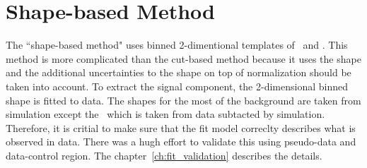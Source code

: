 \section{Shape-based Method}
\label{sec:shape}

The ``shape-based method" uses binned 2-dimentional templates of \mT\ and \mll. 
This method is more complicated than the cut-based method
because it uses the shape and the additional uncertainties to the shape 
on top of normalization should be taken into account. 
To extract the signal component, the 2-dimensional binned shape is fitted to data. 
The shapes for the most of the background are taken from simulation except 
the \Wjets\ which is taken from data subtacted by simulation. 
Therefore, it is critial to make sure that the fit model correclty describes 
what is observed in data. There was a hugh effort to validate this using 
pseudo-data and data-control region. The chapter~\ref{ch:fit_validation} describes 
the details. 

